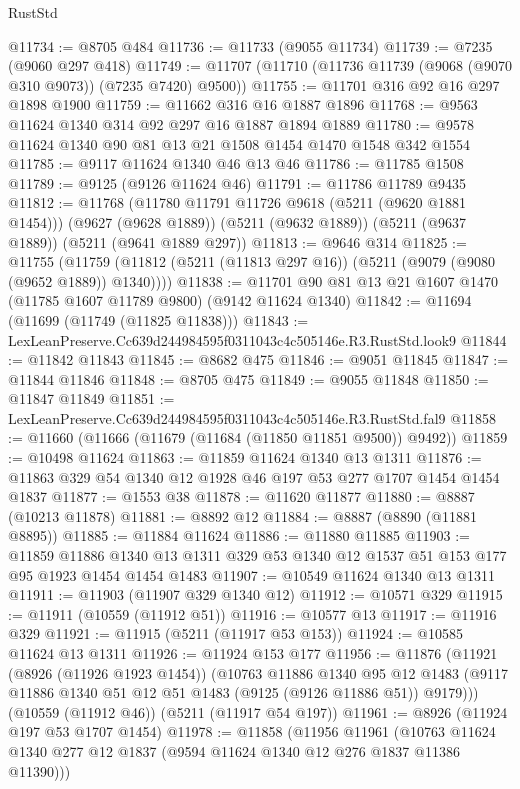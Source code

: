 \begin{lexlean}{RustStd}
\begin{coremodule}
@11734 := @8705 @484
@11736 := @11733 (@9055 @11734)
@11739 := @7235 (@9060 @297 @418)
@11749 := @11707 (@11710 (@11736 @11739 (@9068 (@9070 @310 @9073)) (@7235 @7420) @9500))
@11755 := @11701 @316 @92 @16 @297 @1898 @1900
@11759 := @11662 @316 @16 @1887 @1896
@11768 := @9563 @11624 @1340 @314 @92 @297 @16 @1887 @1894 @1889
@11780 := @9578 @11624 @1340 @90 @81 @13 @21 @1508 @1454 @1470 @1548 @342 @1554
@11785 := @9117 @11624 @1340 @46 @13 @46
@11786 := @11785 @1508
@11789 := @9125 (@9126 @11624 @46)
@11791 := @11786 @11789 @9435
@11812 := @11768
    (@11780 @11791 @11726 @9618 (@5211 (@9620 @1881 @1454)))
    (@9627 (@9628 @1889))
    (@5211 (@9632 @1889))
    (@5211 (@9637 @1889))
    (@5211 (@9641 @1889 @297))
@11813 := @9646 @314
@11825 := @11755
    (@11759 (@11812 (@5211 (@11813 @297 @16)) (@5211 (@9079 (@9080 (@9652 @1889)) @1340))))
@11838 := @11701 @90 @81 @13 @21 @1607 @1470 (@11785 @1607 @11789 @9800) (@9142 @11624 @1340)
@11842 := @11694 (@11699 (@11749 (@11825 @11838)))
@11843 := LexLeanPreserve.Cc639d244984595f0311043c4c505146e.R3.RustStd.look9
@11844 := @11842 @11843
@11845 := @8682 @475
@11846 := @9051 @11845
@11847 := @11844 @11846
@11848 := @8705 @475
@11849 := @9055 @11848
@11850 := @11847 @11849
@11851 := LexLeanPreserve.Cc639d244984595f0311043c4c505146e.R3.RustStd.fal9
@11858 := @11660 (@11666 (@11679 (@11684 (@11850 @11851 @9500)) @9492))
@11859 := @10498 @11624
@11863 := @11859 @11624 @1340 @13 @1311
@11876 := @11863 @329 @54 @1340 @12 @1928 @46 @197 @53 @277 @1707 @1454 @1454 @1837
@11877 := @1553 @38
@11878 := @11620 @11877
@11880 := @8887 (@10213 @11878)
@11881 := @8892 @12
@11884 := @8887 (@8890 (@11881 @8895))
@11885 := @11884 @11624
@11886 := @11880 @11885
@11903 := @11859
    @11886
    @1340
    @13
    @1311
    @329
    @53
    @1340
    @12
    @1537
    @51
    @153
    @177
    @95
    @1923
    @1454
    @1454
    @1483
@11907 := @10549 @11624 @1340 @13 @1311
@11911 := @11903 (@11907 @329 @1340 @12)
@11912 := @10571 @329
@11915 := @11911 (@10559 (@11912 @51))
@11916 := @10577 @13
@11917 := @11916 @329
@11921 := @11915 (@5211 (@11917 @53 @153))
@11924 := @10585 @11624 @13 @1311
@11926 := @11924 @153 @177
@11956 := @11876
    (@11921
      (@8926 (@11926 @1923 @1454))
      (@10763
        @11886
        @1340
        @95
        @12
        @1483
        (@9117 @11886 @1340 @51 @12 @51 @1483 (@9125 (@9126 @11886 @51)) @9179)))
    (@10559 (@11912 @46))
    (@5211 (@11917 @54 @197))
@11961 := @8926 (@11924 @197 @53 @1707 @1454)
@11978 := @11858
    (@11956
      @11961
      (@10763 @11624 @1340 @277 @12 @1837 (@9594 @11624 @1340 @12 @276 @1837 @11386 @11390)))

\end{coremodule}
\end{lexlean}

